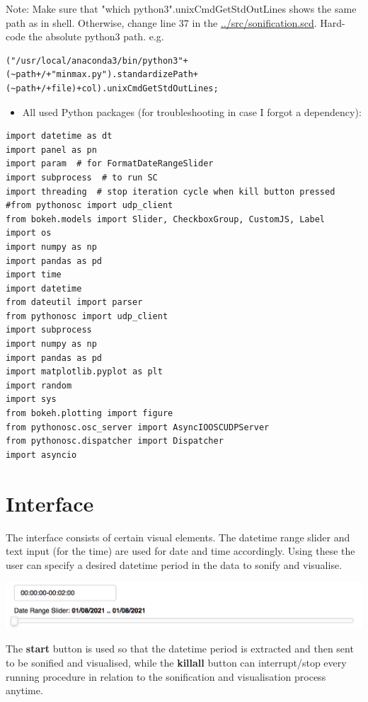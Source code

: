\documentclass[11pt]{article}
\begin{document}
\noindent
Note: Make sure that "which python3".unixCmdGetStdOutLines shows the same path as in shell.  Otherwise, change line 37 in the \url{../src/sonification.scd}.  Hard-code the absolute python3 path.  e.g.
\begin{verbatim}
("/usr/local/anaconda3/bin/python3"+(~path+/+"minmax.py").standardizePath+(~path+/+file)+col).unixCmdGetStdOutLines;
\end{verbatim}

\begin{itemize}
\item All used Python packages (for troubleshooting in case I forgot a dependency):
\end{itemize}

\begin{verbatim}
import datetime as dt
import panel as pn
import param  # for FormatDateRangeSlider
import subprocess  # to run SC
import threading  # stop iteration cycle when kill button pressed
#from pythonosc import udp_client
from bokeh.models import Slider, CheckboxGroup, CustomJS, Label
import os
import numpy as np
import pandas as pd
import time
import datetime
from dateutil import parser
from pythonosc import udp_client
import subprocess
import numpy as np
import pandas as pd
import matplotlib.pyplot as plt
import random
import sys
from bokeh.plotting import figure
from pythonosc.osc_server import AsyncIOOSCUDPServer
from pythonosc.dispatcher import Dispatcher
import asyncio
\end{verbatim}

\section{Interface}
\label{sec:org71abf4c}
The interface consists of certain visual elements.
The datetime range slider and text input (for the time) are used for date and time accordingly. Using these the user can specify a desired datetime period in the data to sonify and visualise.

\begin{center}
\includegraphics[width=.9\linewidth]{./datetime_selection.png}
\end{center}

The \textbf{start} button is used so that the datetime period is extracted and then sent to be sonified and visualised, while the \textbf{killall} button can interrupt/stop every running procedure in relation to the sonification and visualisation process anytime.
\end{document}
